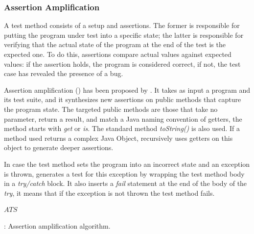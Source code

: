 \subsubsection{Assertion Amplification}
\label{subsec:aampl}

A test method consists of a setup and assertions.
The former is responsible for putting the program under test into a specific state; the latter is responsible for verifying that the actual state of the program at the end of the test is the expected one.
To do this, assertions compare actual values against expected values: if the assertion holds, the program is considered correct, if not, the test case has revealed the presence of a bug.

Assertion amplification (\aampl) has been proposed by \cite{TaoXie2006}.
It takes as input a program and its test suite, and it synthesizes new assertions on public methods that capture the program state.
The targeted public methods are those that take no parameter, return a result, and match a Java naming convention of getters, \eg the method starts with \emph{get} or \emph{is}. The standard method \emph{toString()} is also used.
If a method used returns a complex Java Object, \aampl recursively uses getters on this object to generate deeper assertions.

In case the test method sets the program into an incorrect state and an exception is thrown, \aampl generates a test for this exception by wrapping the test method body in a \emph{try/catch} block. 
It also inserts a \emph{fail} statement at the end of the body of the \emph{try}, \ie it means that if the exception is not thrown the test method fails.

\begin{algorithm}[h]
\begin{algorithmic}[1]
    \EndFor
\EndFor
\Return $ATS$
\end{algorithmic}
\caption{\aampl: Assertion amplification algorithm.}
\label{algo:aampl}
\end{algorithm}

